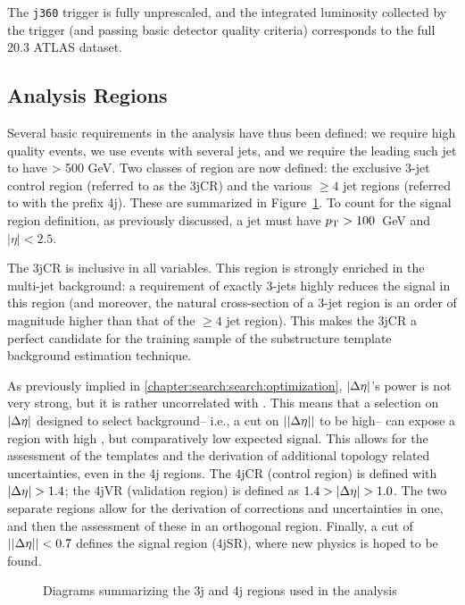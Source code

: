 The \texttt{j360} trigger is fully unprescaled, and the integrated luminosity collected by the trigger (and passing basic detector quality criteria) corresponds to the full 20.3 \ifb ATLAS dataset.

\subsection{Analysis Regions}
\label{chapter:search:search:regions}

Several basic requirements in the analysis have thus been defined: we require high quality events, we use events with several \largeR jets, and we require the leading such jet to have \ptjet > 500 GeV. Two classes of region are now defined: the exclusive 3-jet control region (referred to as the 3jCR) and the various $\geq 4$ jet regions (referred to with the prefix 4j). These are summarized in Figure~\ref{fig:search:search:regions}. To count for the signal region definition, as previously discussed, a jet must have $p_{\text{T}} > 100$~GeV and $|\eta| < 2.5$. 

The 3jCR is inclusive in all variables. This region is strongly enriched in the multi-jet background: a requirement of exactly 3-jets highly reduces the signal in this region (and moreover, the natural cross-section of a 3-jet region is an order of magnitude higher than that of the $\geq 4$ jet region). This makes the 3jCR a perfect candidate for the training sample of the substructure template background estimation technique.

As previously implied in \ref{chapter:search:search:optimization}, $|\Delta\eta|$'s power is not very strong, but it is rather uncorrelated with \MJ. This means that a selection on $|\Delta\eta|$ designed to select background-- i.e., a cut on $||\Delta\eta||$ to be high-- can expose a region with high \MJ, but comparatively low expected signal. This allows for the assessment of the templates and the derivation of additional topology related uncertainties, even in the 4j regions. The 4jCR (control region) is defined with $|\Delta\eta| > 1.4$; the 4jVR (validation region) is defined as $1.4 >|\Delta\eta| > 1.0$. The two separate regions allow for the derivation of corrections and uncertainties in one, and then the assessment of these in an orthogonal region. Finally, a cut of $||\Delta\eta|| < 0.7$ defines the signal region (4jSR), where new physics is hoped to be found.

\begin{figure}[!ht]
  \centering
    \caption{Diagrams summarizing the 3j and 4j regions used in the analysis}
  \label{fig:search:search:regions}
\end{figure}

